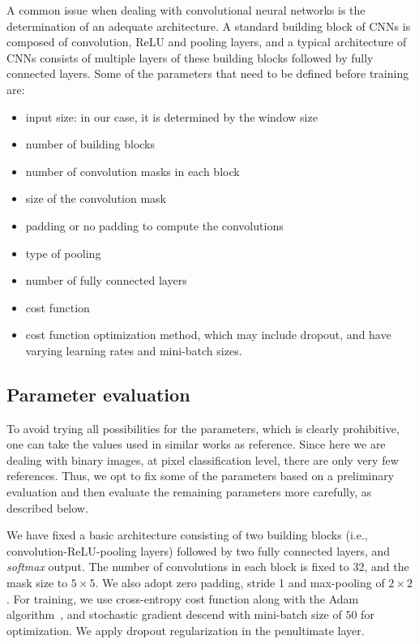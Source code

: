 \documentclass[conference]{IEEEtran}
\begin{document}
A common issue when dealing with convolutional neural 
networks is the determination of an adequate architecture. 
A standard building block of CNNs is composed of convolution, ReLU
and pooling layers, and a typical architecture of CNNs consists of
multiple layers of these building blocks followed by fully connected
layers. Some of the parameters that need to be defined before training
are:
\begin{itemize}
  \item input size: in our case, it is determined by the window size
  \item number of building blocks
  \item number of convolution masks in each block
  \item size of the convolution mask
  \item padding or no padding to compute the convolutions
  \item type of pooling
  \item number of fully connected layers
  \item cost function
  \item cost function optimization method, which may include dropout,
    and have varying learning rates and mini-batch sizes.
\end{itemize}


\subsection{Parameter evaluation}

To avoid trying all possibilities for the parameters, which is clearly
prohibitive, one can take the values used in similar works as reference.
Since here we are dealing with binary images, at pixel classification
level, there are only very few references. Thus, we opt to fix some of
the parameters based on a preliminary evaluation and then evaluate the
remaining parameters more carefully, as described below.



We have fixed a basic architecture consisting of two building blocks
(i.e., convolution-ReLU-pooling layers) followed by two fully connected
layers, and \textit{softmax} output. The number of convolutions in
each block is fixed to 32, and the mask size to $5 \times 5$. We also
adopt zero padding, stride 1 and max-pooling of $2\times 2$. For training, we use cross-entropy
cost function along with the Adam algorithm~\cite{Kingma:2014}, and
stochastic gradient descend with mini-batch size of $50$ for
optimization. We apply dropout regularization in the penultimate
layer.
\end{document}

